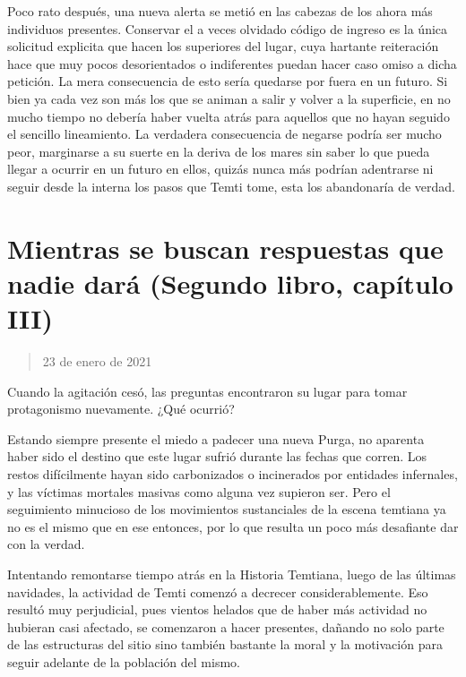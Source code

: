 \documentclass[
  spanish,
]{book}
\begin{document}
Poco rato después, una nueva alerta se metió en las cabezas de los ahora más individuos presentes. Conservar el a veces olvidado código de ingreso es la única solicitud explicita que hacen los superiores del lugar, cuya hartante reiteración hace que muy pocos desorientados o indiferentes puedan hacer caso omiso a dicha petición. La mera consecuencia de esto sería quedarse por fuera en un futuro. Si bien ya cada vez son más los que se animan a salir y volver a la superficie, en no mucho tiempo no debería haber vuelta atrás para aquellos que no hayan seguido el sencillo lineamiento. La verdadera consecuencia de negarse podría ser mucho peor, marginarse a su suerte en la deriva de los mares sin saber lo que pueda llegar a ocurrir en un futuro en ellos, quizás nunca más podrían adentrarse ni seguir desde la interna los pasos que Temti tome, esta los abandonaría de verdad.

\hypertarget{mientras-se-buscan-respuestas-que-nadie-daruxe1-segundo-libro-capuxedtulo-iii}{%
\section{Mientras se buscan respuestas que nadie dará (Segundo libro, capítulo III)}\label{mientras-se-buscan-respuestas-que-nadie-daruxe1-segundo-libro-capuxedtulo-iii}}

\begin{quote}
23 de enero de 2021
\end{quote}

Cuando la agitación cesó, las preguntas encontraron su lugar para tomar protagonismo nuevamente. ¿Qué ocurrió?

Estando siempre presente el miedo a padecer una nueva Purga, no aparenta haber sido el destino que este lugar sufrió durante las fechas que corren. Los restos difícilmente hayan sido carbonizados o incinerados por entidades infernales, y las víctimas mortales masivas como alguna vez supieron ser. Pero el seguimiento minucioso de los movimientos sustanciales de la escena temtiana ya no es el mismo que en ese entonces, por lo que resulta un poco más desafiante dar con la verdad.

Intentando remontarse tiempo atrás en la Historia Temtiana, luego de las últimas navidades, la actividad de Temti comenzó a decrecer considerablemente. Eso resultó muy perjudicial, pues vientos helados que de haber más actividad no hubieran casi afectado, se comenzaron a hacer presentes, dañando no solo parte de las estructuras del sitio sino también bastante la moral y la motivación para seguir adelante de la población del mismo.
\end{document}
